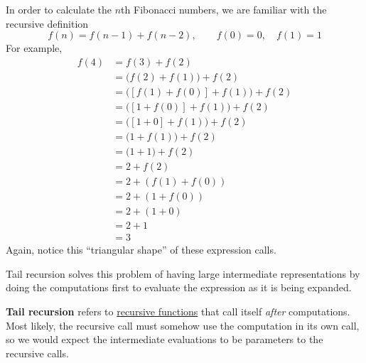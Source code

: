   \begin{example}
    \label{ex:fibonacci-numbers-with-head-recursion}
    In order to calculate the $n$th Fibonacci numbers, we are familiar with the recursive definition 
    \begin{equation}
      f(n) = f(n-1) + f(n-2), \qquad f(0) = 0, \quad f(1) = 1
    \end{equation}
    For example, 
    \begin{align}
      f(4) & = f(3) + f(2) \\ 
           & = \big( f(2) + f(1) \big) + f(2) \\ 
           & = \big( [f(1) + f(0)] + f(1) \big) + f(2) \\ 
           & = \big( [1 + f(0)] + f(1) \big) + f(2) \\ 
           & = \big( [1 + 0] + f(1) \big) + f(2) \\ 
           & = \big( 1 + f(1) \big) + f(2) \\ 
           & = \big( 1 + 1 \big) + f(2) \\ 
           & = 2 + f(2) \\  
           & = 2 + (f(1) + f(0)) \\ 
           & = 2 + (1 + f(0)) \\ 
           & = 2 + (1 + 0) \\ 
           & = 2 + 1 \\ 
           & = 3
    \end{align}
    Again, notice this ``triangular shape'' of these expression calls. 
  \end{example}

  Tail recursion solves this problem of having large intermediate representations by doing the computations first to evaluate the expression as it is being expanded. 

  \begin{definition}
    \label{def:tail-recursion}
    \textbf{Tail recursion} refers to \hyperref[def:recursive-function]{recursive functions} that call itself \textit{after} computations. Most likely, the recursive call must somehow use the computation in its own call, so we would expect the intermediate evaluations to be parameters to the recursive calls. 
  \end{definition} 


